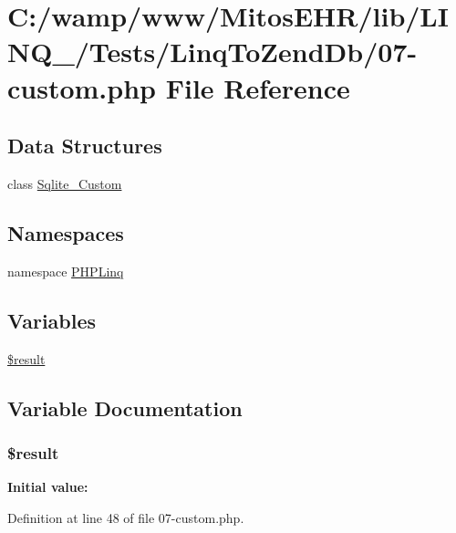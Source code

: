 \hypertarget{07-custom_8php}{\section{\-C\-:/wamp/www/\-Mitos\-E\-H\-R/lib/\-L\-I\-N\-Q\-\_/\-Tests/\-Linq\-To\-Zend\-Db/07-\/custom.php \-File \-Reference}
\label{07-custom_8php}
}
\subsection*{\-Data \-Structures}
\begin{DoxyCompactItemize}
\item 
class \hyperlink{class_sqlite___custom}{\-Sqlite\-\_\-\-Custom}
\end{DoxyCompactItemize}
\subsection*{\-Namespaces}
\begin{DoxyCompactItemize}
\item 
namespace \hyperlink{namespace_p_h_p_linq}{\-P\-H\-P\-Linq}
\end{DoxyCompactItemize}
\subsection*{\-Variables}
\begin{DoxyCompactItemize}
\item 
\hyperlink{07-custom_8php_a112ef069ddc0454086e3d1e6d8d55d07}{\$result}
\end{DoxyCompactItemize}


\subsection{\-Variable \-Documentation}
\hypertarget{07-custom_8php_a112ef069ddc0454086e3d1e6d8d55d07}{
\subsubsection[{\$result}]{\setlength{\rightskip}{0pt plus 5cm}\$result}}\label{07-custom_8php_a112ef069ddc0454086e3d1e6d8d55d07}
{\bfseries \-Initial value\-:}


\-Definition at line 48 of file 07-\/custom.\-php.

